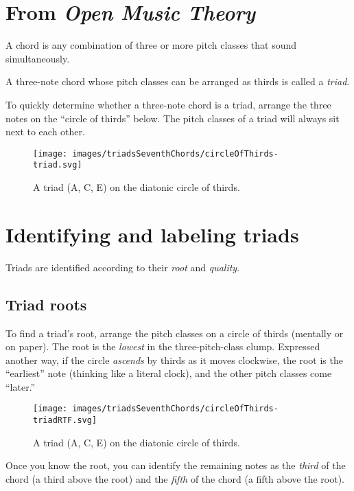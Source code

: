 \documentclass{book}
\begin{document}
\hypertarget{from-open-music-theory-8}{%
\section{\texorpdfstring{From \emph{Open Music
Theory}}{From Open Music Theory}}\label{from-open-music-theory-8}}

A chord is any combination of three or more pitch classes that sound
simultaneously.

A three-note chord whose pitch classes can be arranged as thirds is called a
\emph{triad}.

To quickly determine whether a three-note chord is a triad, arrange the three
notes on the ``circle of thirds'' below. The pitch classes of a triad will
always sit next to each other.

\begin{figure}
\centering
\texttt{[image: images/triadsSeventhChords/circleOfThirds-triad.svg]}
\caption{A triad (A, C, E) on the diatonic circle of thirds.}
\end{figure}

\hypertarget{identifying-and-labeling-triads}{%
\section{Identifying and labeling
triads}\label{identifying-and-labeling-triads}}

Triads are identified according to their \emph{root} and \emph{quality}.

\hypertarget{triad-roots}{%
\subsection{Triad roots}\label{triad-roots}}

To find a triad's root, arrange the pitch classes on a circle of thirds
(mentally or on paper). The root is the \emph{lowest} in the three-pitch-class
clump. Expressed another way, if the circle \emph{ascends} by thirds as it
moves clockwise, the root is the ``earliest'' note (thinking like a literal
clock), and the other pitch classes come ``later.''

\begin{figure}
\centering
\texttt{[image: images/triadsSeventhChords/circleOfThirds-triadRTF.svg]}
\caption{A triad (A, C, E) on the diatonic circle of thirds.}
\end{figure}

Once you know the root, you can identify the remaining notes as the
\emph{third} of the chord (a third above the root) and the \emph{fifth} of the
chord (a fifth above the root).
\end{document}

